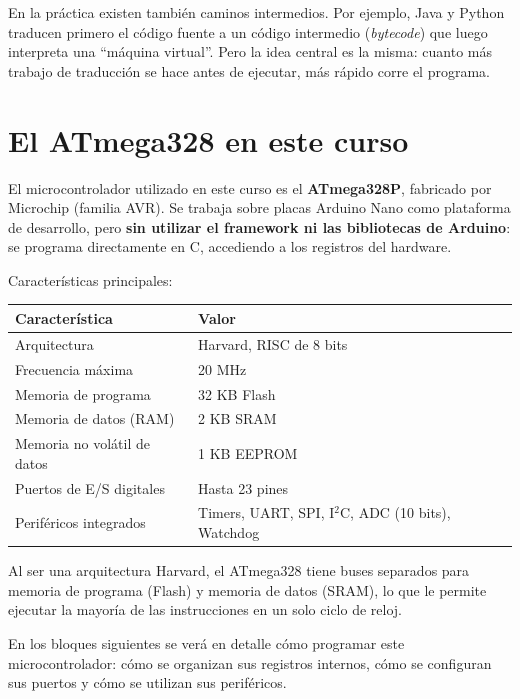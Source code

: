 \begin{notabox}
En la práctica existen también caminos intermedios. Por ejemplo, Java y Python traducen primero el código fuente a un código intermedio (\emph{bytecode}) que luego interpreta una ``máquina virtual''. Pero la idea central es la misma: cuanto más trabajo de traducción se hace antes de ejecutar, más rápido corre el programa.
\end{notabox}

\section{El ATmega328 en este curso}

El microcontrolador utilizado en este curso es el \textbf{ATmega328P}, fabricado por Microchip (familia AVR). Se trabaja sobre placas Arduino Nano como plataforma de desarrollo, pero \textbf{sin utilizar el framework ni las bibliotecas de Arduino}: se programa directamente en C, accediendo a los registros del hardware.

Características principales:

\begin{table}[H]
\centering
\begin{tabular}{ll}
\toprule
Característica & Valor \\
\midrule
Arquitectura & Harvard, RISC de 8 bits \\
Frecuencia máxima & 20 MHz \\
Memoria de programa & 32 KB Flash \\
Memoria de datos (RAM) & 2 KB SRAM \\
Memoria no volátil de datos & 1 KB EEPROM \\
Puertos de E/S digitales & Hasta 23 pines \\
Periféricos integrados & Timers, UART, SPI, I$^2$C, ADC (10 bits), Watchdog \\
\bottomrule
\end{tabular}
\end{table}

Al ser una arquitectura Harvard, el ATmega328 tiene buses separados para memoria de programa (Flash) y memoria de datos (SRAM), lo que le permite ejecutar la mayoría de las instrucciones en un solo ciclo de reloj.

En los bloques siguientes se verá en detalle cómo programar este microcontrolador: cómo se organizan sus registros internos, cómo se configuran sus puertos y cómo se utilizan sus periféricos.
